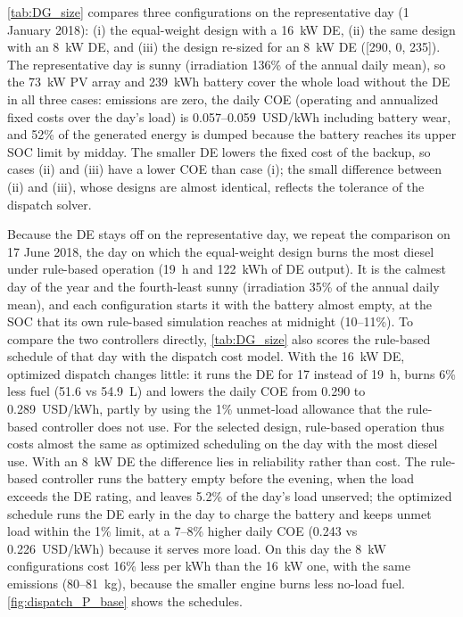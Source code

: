 \documentclass[final,3p,times]{elsarticle}
\begin{document}
\cref{tab:DG_size} compares three configurations on the representative day (1 January 2018): (i) the equal-weight design with a 16~kW DE, (ii) the same design with an 8~kW DE, and (iii) the design re-sized for an 8~kW DE ([290, 0, 235]). The representative day is sunny (irradiation 136\% of the annual daily mean), so the 73~kW PV array and 239~kWh battery cover the whole load without the DE in all three cases: emissions are zero, the daily COE (operating and annualized fixed costs over the day's load) is 0.057--0.059~USD/kWh including battery wear, and 52\% of the generated energy is dumped because the battery reaches its upper SOC limit by midday. The smaller DE lowers the fixed cost of the backup, so cases (ii) and (iii) have a lower COE than case (i); the small difference between (ii) and (iii), whose designs are almost identical, reflects the tolerance of the dispatch solver.

Because the DE stays off on the representative day, we repeat the comparison on 17 June 2018, the day on which the equal-weight design burns the most diesel under rule-based operation (19~h and 122~kWh of DE output). It is the calmest day of the year and the fourth-least sunny (irradiation 35\% of the annual daily mean), and each configuration starts it with the battery almost empty, at the SOC that its own rule-based simulation reaches at midnight (10--11\%). To compare the two controllers directly, \cref{tab:DG_size} also scores the rule-based schedule of that day with the dispatch cost model. With the 16~kW DE, optimized dispatch changes little: it runs the DE for 17 instead of 19~h, burns 6\% less fuel (51.6 vs 54.9~L) and lowers the daily COE from 0.290 to 0.289~USD/kWh, partly by using the 1\% unmet-load allowance that the rule-based controller does not use. For the selected design, rule-based operation thus costs almost the same as optimized scheduling on the day with the most diesel use. With an 8~kW DE the difference lies in reliability rather than cost. The rule-based controller runs the battery empty before the evening, when the load exceeds the DE rating, and leaves 5.2\% of the day's load unserved; the optimized schedule runs the DE early in the day to charge the battery and keeps unmet load within the 1\% limit, at a 7--8\% higher daily COE (0.243 vs 0.226~USD/kWh) because it serves more load. On this day the 8~kW configurations cost 16\% less per kWh than the 16~kW one, with the same emissions (80--81~kg), because the smaller engine burns less no-load fuel. \cref{fig:dispatch_P_base} shows the schedules.
\end{document}
